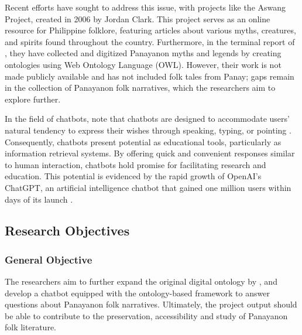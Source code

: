 Recent efforts have sought to address this issue, with projects like the Aswang Project, created in 2006 by Jordan Clark. This project serves as an online resource for Philippine folklore, featuring articles about various myths, creatures, and spirits found throughout the country. Furthermore, in the terminal report of , they have collected and digitized Panayanon myths and legends by creating ontologies using Web Ontology Language (OWL). However, their work is not made publicly available and has not included folk tales from Panay; gaps remain in the collection of Panayanon folk narratives, which the researchers aim to explore further.

In the field of chatbots,  note that chatbots are designed to accommodate users' natural tendency to express their wishes through speaking, typing, or pointing \cite{zadrozny2000natural}. Consequently, chatbots present potential as educational tools, particularly as information retrieval systems. By offering quick and convenient responses similar to human interaction, chatbots hold promise for facilitating research and education. This potential is evidenced by the rapid growth of OpenAI’s ChatGPT, an artificial intelligence chatbot that gained one million users within days of its launch \cite{Mortensen_2024}.



\subsection{Research Objectives}
\label{subsecsec:researchobjectives}

\subsubsection{General Objective}
\label{subsec:generalobjective}

The researchers aim to further expand the original digital ontology by , and develop a chatbot equipped with the ontology-based framework to answer questions about Panayanon folk narratives. Ultimately, the project output should be able to contribute to the preservation, accessibility and study of Panayanon folk literature.

